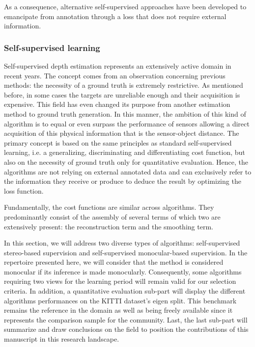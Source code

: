 As a consequence, alternative self-supervised approaches have been developed to emancipate from annotation through a loss that does not require external information.

\subsubsection{Self-supervised learning}\label{usl}

Self-supervised depth estimation represents an extensively active domain in recent years. The concept comes from an observation concerning previous methods: the necessity of a ground truth is extremely restrictive. As mentioned before, in some cases the targets are unreliable enough and their acquisition is expensive.
This field has even changed its purpose from another estimation method to ground truth generation. In this manner, the ambition of this kind of algorithm is to equal or even surpass the performance of sensors allowing a direct acquisition of this physical information that is the sensor-object distance.
The primary concept is based on the same principles as standard self-supervised learning, i.e. a generalizing, discriminating and differentiating cost function, but also on the necessity of ground truth only for quantitative evaluation. Hence, the algorithms are not relying on external annotated data and can exclusively refer to the information they receive or produce to deduce the result by optimizing the loss function.

Fundamentally, the cost functions are similar across algorithms. They predominantly consist of the assembly of several terms of which two are extensively present: the reconstruction term and the smoothing term.

In this section, we will address two diverse types of algorithms: self-supervised stereo-based supervision and self-supervised monocular-based supervision. In the repertoire presented here, we will consider that the method is considered monocular if its inference is made monocularly. Consequently, some algorithms requiring two views for the learning period will remain valid for our selection criteria. 
In addition, a quantitative evaluation sub-part will display the different algorithms performances on the KITTI dataset's eigen split. This benchmark remains the reference in the domain as well as being freely available since it represents the comparison sample for the community.
Last, the last sub-part will summarize and draw conclusions on the field to position the contributions of this manuscript in this research landscape.

